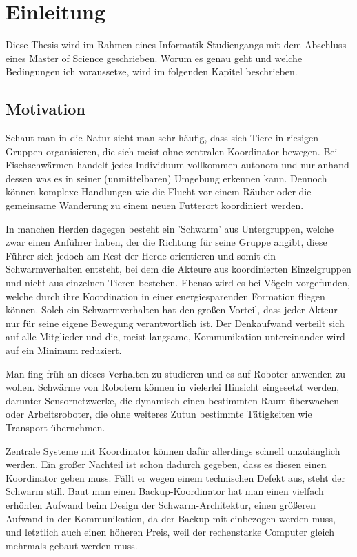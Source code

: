 \chapter{Einleitung}\label{ch:Einleitung}
Diese Thesis wird im Rahmen eines Informatik-Studiengangs mit dem Abschluss eines Master of Science geschrieben. Worum es genau geht und welche Bedingungen ich voraussetze, wird im folgenden Kapitel beschrieben.

\section{Motivation}\label{sec:Motivation}
Schaut man in die Natur sieht man sehr häufig, dass sich Tiere in riesigen Gruppen organisieren, die sich meist ohne zentralen Koordinator bewegen.
Bei Fischschwärmen handelt jedes Individuum vollkommen autonom und nur anhand dessen was es in seiner (unmittelbaren) Umgebung erkennen kann. Dennoch können komplexe Handlungen wie die Flucht vor einem Räuber oder die gemeinsame Wanderung zu einem neuen Futterort koordiniert werden.

In manchen Herden dagegen besteht ein 'Schwarm' aus Untergruppen, welche zwar einen Anführer haben, der die Richtung für seine Gruppe angibt, diese Führer sich jedoch am Rest der Herde orientieren und somit ein Schwarmverhalten entsteht, bei dem die Akteure aus koordinierten Einzelgruppen und nicht aus einzelnen Tieren bestehen.
Ebenso wird es bei Vögeln vorgefunden, welche durch ihre Koordination in einer energiesparenden Formation fliegen können.
Solch ein Schwarmverhalten hat den großen Vorteil, dass jeder Akteur nur für seine eigene Bewegung verantwortlich ist. Der Denkaufwand verteilt sich auf alle Mitglieder und die, meist langsame, Kommunikation untereinander wird auf ein Minimum reduziert.

Man fing früh an dieses Verhalten zu studieren und es auf Roboter anwenden zu wollen. Schwärme von Robotern können in vielerlei Hinsicht eingesetzt werden, darunter Sensornetzwerke, die dynamisch einen bestimmten Raum überwachen oder Arbeitsroboter, die ohne weiteres Zutun bestimmte Tätigkeiten wie Transport übernehmen.

Zentrale Systeme mit Koordinator können dafür allerdings schnell unzulänglich werden. Ein großer Nachteil ist schon dadurch gegeben, dass es diesen einen Koordinator geben muss. Fällt er wegen einem technischen Defekt aus, steht der Schwarm still. Baut man einen Backup-Koordinator hat man einen vielfach erhöhten Aufwand beim Design der Schwarm-Architektur, einen größeren Aufwand in der Kommunikation, da der Backup mit einbezogen werden muss, und letztlich auch einen höheren Preis, weil der rechenstarke Computer gleich mehrmals gebaut werden muss.

